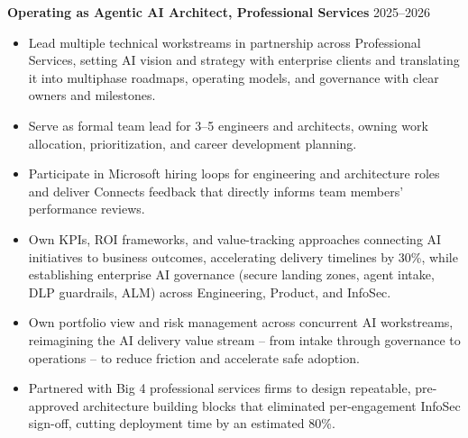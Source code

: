 \documentclass[margin]{res}
\begin{document}
\begin{resume}
\textbf{Operating as Agentic AI Architect, Professional Services} \hfill 2025--2026\\
\begin{itemize}
\item Lead multiple technical workstreams in partnership across Professional Services, setting AI vision and strategy with enterprise clients and translating it into multiphase roadmaps, operating models, and governance with clear owners and milestones.
\item Serve as formal team lead for 3--5 engineers and architects, owning work allocation, prioritization, and career development planning.
\item Participate in Microsoft hiring loops for engineering and architecture roles and deliver Connects feedback that directly informs team members' performance reviews.
\item Own KPIs, ROI frameworks, and value-tracking approaches connecting AI initiatives to business outcomes, accelerating delivery timelines by 30\%, while establishing enterprise AI governance (secure landing zones, agent intake, DLP guardrails, ALM) across Engineering, Product, and InfoSec.
\item Own portfolio view and risk management across concurrent AI workstreams, reimagining the AI delivery value stream -- from intake through governance to operations -- to reduce friction and accelerate safe adoption.
\item Partnered with Big 4 professional services firms to design repeatable, pre-approved architecture building blocks that eliminated per-engagement InfoSec sign-off, cutting deployment time by an estimated 80\%.
\end{itemize}


\end{resume}
\end{document}
